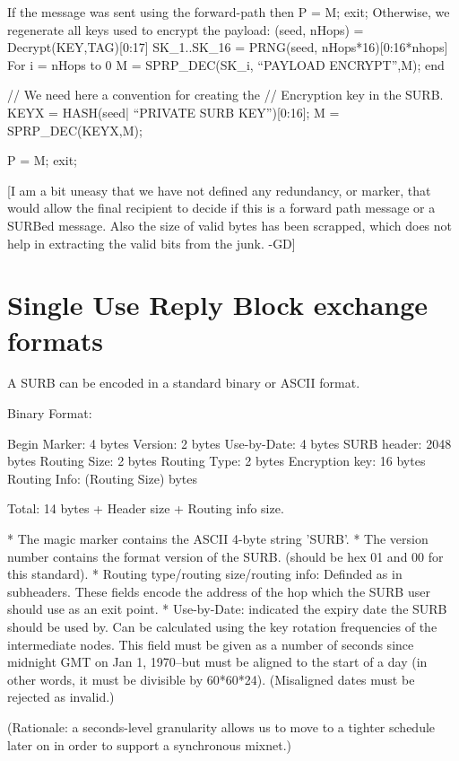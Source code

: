 	If the message was sent using the forward-path then 
		P = M; exit;
	Otherwise, we regenerate all keys used to encrypt the payload:
		(seed, nHops) = Decrypt(KEY,TAG)[0:17]
		SK_1..SK_16 = PRNG(seed, nHops*16)[0:16*nhops]
		For i = nHops to 0
			M = SPRP_DEC(SK_i, ``PAYLOAD ENCRYPT'',M);
		end

		// We need here a convention for creating the
		//   Encryption key in the SURB.
		KEYX = HASH(seed| ``PRIVATE SURB KEY'')[0:16];
		M = SPRP_DEC(KEYX,M);
		
		P = M; exit;

[I am a bit uneasy that we have not defined any redundancy, or marker,
that would allow the final recipient to decide if this is a forward
path message or a SURBed message. Also the size of valid bytes has
been scrapped, which does not help in extracting the valid bits from
the junk. -GD]

\section{Single Use Reply Block exchange formats}

A SURB can be encoded in a standard binary or ASCII format.

Binary Format:

   Begin Marker: 4 bytes
   Version:      2 bytes
   Use-by-Date:  4 bytes
   SURB header:  2048 bytes
   Routing Size: 2 bytes
   Routing Type: 2 bytes
   Encryption key: 16 bytes
   Routing Info: (Routing Size) bytes

   Total: 14 bytes + Header size + Routing info size.

* The magic marker contains the ASCII 4-byte string 'SURB'. 
* The version number contains the format version of the SURB.
  (should be hex 01 and 00 for this standard).
* Routing type/routing size/routing info: Definded as in subheaders.  
  These fields encode the address of the hop which the SURB user should
  use as an exit point.
* Use-by-Date: indicated the expiry date the SURB should be used by. Can
  be calculated using the key rotation frequencies of the intermediate
  nodes.  This field must be given as a number of seconds since
  midnight GMT on Jan 1, 1970--but must be aligned to the start of a
  day (in other words, it must be divisible by 60*60*24).
  (Misaligned dates must be rejected as invalid.)

  (Rationale: a seconds-level granularity allows us to move to a
  tighter schedule later on in order to support a synchronous mixnet.)

